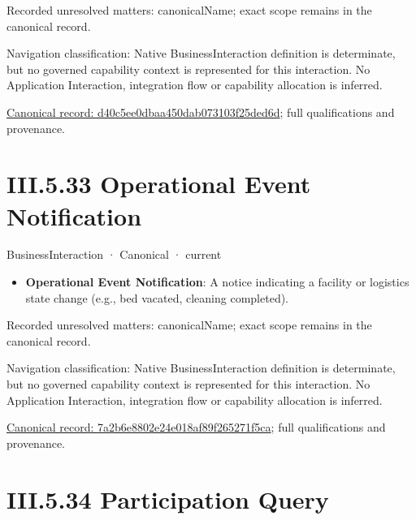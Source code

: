 {\small Recorded unresolved matters: canonicalName; exact scope remains in the canonical record.}\par
{\small Navigation classification: Native BusinessInteraction definition is determinate, but no governed capability context is represented for this interaction. No Application Interaction, integration flow or capability allocation is inferred.}\par
{\footnotesize \href{../../../../../../../continuum/business/business-interaction/d40c5ee0dbaa450dab073103f25ded6d.md}{Canonical record: d40c5ee0dbaa450dab073103f25ded6d}; full qualifications and provenance.}\par
\section*{III.5.33 Operational Event Notification}
\label{navigation:III.5.33}

\label{element:7a2b6e8802e24e018af89f265271f5ca}
{\small BusinessInteraction · Canonical · current}\par

\begin{itemize}


\item \textbf{Operational Event Notification}: A notice indicating a facility or logistics state change (e.g., bed vacated, cleaning completed).

\end{itemize}

{\small Recorded unresolved matters: canonicalName; exact scope remains in the canonical record.}\par
{\small Navigation classification: Native BusinessInteraction definition is determinate, but no governed capability context is represented for this interaction. No Application Interaction, integration flow or capability allocation is inferred.}\par
{\footnotesize \href{../../../../../../../continuum/business/business-interaction/7a2b6e8802e24e018af89f265271f5ca.md}{Canonical record: 7a2b6e8802e24e018af89f265271f5ca}; full qualifications and provenance.}\par
\section*{III.5.34 Participation Query}
\label{navigation:III.5.34}

